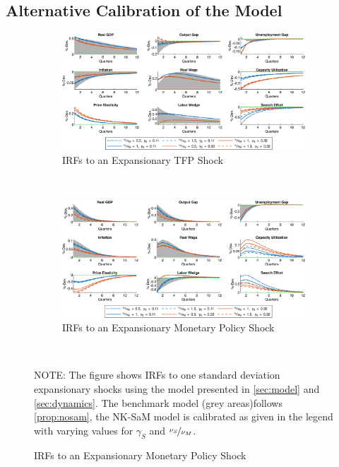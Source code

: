 \documentclass[12pt,3p,authoryear,review]{elsarticle}
\begin{document}
\subsection{Alternative Calibration of the Model}\label{sec:calibration_add}%
\begin{figure}[h!]%
    \centering%
    \caption{Variation in $\nicefrac{\nu_S}{\nu_M}$ - IRFs to Expansionary TFP and Demand Shocks}%
    \begin{subfigure}{\textwidth}%
        \centering%
        \caption{IRFs to an Expansionary TFP Shock}%
        \includegraphics[width=\textwidth]{fig_14_irf_robust_nuSnuM_tfp.png}%
    \end{subfigure}\\%
	\vspace{0.2in}%
    \begin{subfigure}{\textwidth}%
        \centering%
        \caption{IRFs to an Expansionary Monetary Policy Shock}%
        \includegraphics[width=\textwidth]{fig_15_irf_robust_nuSnuM_policy.png}%
    \end{subfigure}\\%
    {\tiny \singlespacing NOTE: The figure shows IRFs to one standard deviation expansionary shocks using the model presented in \cref{sec:model} and \cref{sec:dynamics}. The benchmark model (grey areas)follows \cref{prop:nosam}, the NK-SaM model is calibrated as given in the legend with varying values for $\gamma_S$ and $\nicefrac{\nu_S}{\nu_M}$.\par}%
\end{figure}%
\end{document}
